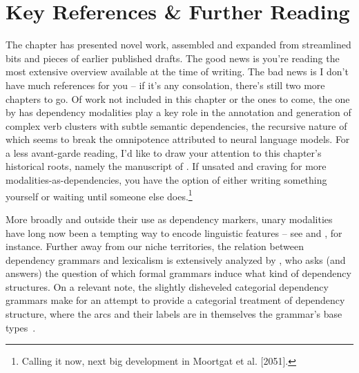 \section{Key References \& Further Reading}
\label{section:references_2}
The chapter has presented novel work, assembled and expanded from streamlined bits and pieces of earlier published drafts.
The good news is you're reading the most extensive overview available at the time of writing.
The bad news is I don't have much references for you -- if it's any consolation, there's still two more chapters to go.
Of work not included in this chapter or the ones to come, the one by \citet{rouss} has dependency modalities play a key role in the annotation and generation of complex verb clusters with subtle semantic dependencies, the recursive nature of which seems to break the omnipotence attributed to neural language models.
For a less avant-garde reading, I'd like to draw your attention to this chapter's historical roots, namely the manuscript of \citet{moortgat1991heads}.
If unsated and craving for more modalities-as-dependencies, you have the option of either writing something yourself or waiting until someone else does.\footnote{Calling it now, next big development in Moortgat et al. [2051].}

More broadly and outside their use as dependency markers, unary modalities have long now been a tempting way to encode linguistic features -- see \citet{moa} and \citet{10.7551/mitpress/6169.003.0012,johnson1999resource}, for instance.
Further away from our niche territories, the relation between dependency grammars and lexicalism is extensively analyzed by \citet{kuhlmann2010dependency}, who asks (and answers) the question of which formal grammars induce what kind of dependency structures.
On a relevant note, the slightly disheveled categorial dependency grammars make for an attempt to provide a categorial treatment of dependency structure, where the arcs and their labels are in themselves the grammar's base types~\cite{dekhtyar2015categorial}.


